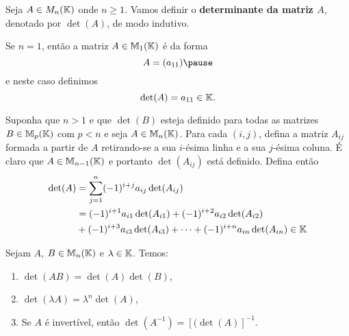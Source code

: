 \documentclass{beamer}
\begin{document}
    \begin{frame}
        Seja $A \in M_n(\mathbb{K})$ onde $n \ge 1$. \pause Vamos definir o \textbf{determinante da matriz $A$}, \pause denotado por
        $\det(A)$, \pause de modo indutivo.\pause

        Se $n = 1$, \pause então a matriz $A \in \mathbb{M}_1(\mathbb{K})$ \pause é da forma
        \[
            A = (a_{11})\pause
        \]
        e neste caso definimos\pause
        \[
            \det(A) = a_{11} \in \mathbb{K}.
        \]
    \end{frame}

\begin{frame}
        Suponha que $n > 1$ \pause e que $\det(B)$ \pause esteja definido para todas as matrizes $B \in \mathbb{M}_p(\mathbb{K})$ \pause com
        $p < n$ \pause e seja $A \in \mathbb{M}_n(\mathbb{K})$. \pause Para cada $(i,j)$, \pause defina a matriz $A_{ij}$ \pause formada a partir
        de $A$ \pause retirando-se a sua $i$-ésima linha \pause e a sua $j$-ésima coluna. \pause É claro que
        $A \in \mathbb{M}_{n - 1}(\mathbb{K})$ \pause e portanto $\det(A_{ij})$ \pause está definido. \pause Defina então\pause
        \begin{align*}
            \det(A) &= \sum_{j = 1}^n(-1)^{i + j}a_{ij}\det(A_{ij}) \\ &= (-1)^{i + 1}a_{i1}\det(A_{i1}) + (-1)^{i + 2}a_{i2}\det(A_{i2})
                 \\ & + (-1)^{i + 3}a_{i3}\det(A_{i3}) + \cdots + (-1)^{i + n}a_{in}\det(A_{in}) \in \mathbb{K}
        \end{align*}
    \end{frame}

    \begin{frame}
        \begin{proposicao}
            Sejam $A$, $B \in \mathbb{M}_n(\mathbb{K})$ \pause e $\lambda \in \mathbb{K}$. \pause Temos:\pause
            \begin{enumerate}[label={\roman*})]
                \item $\det(AB) = \det(A) \det(B)$,\pause

                \vspace*{1cm}

                \item $\det(\lambda A) = \lambda^n \det(A)$,\pause

                \vspace*{1cm}

                \item Se $A$ é invertível, \pause então $\det(A^{-1}) = [(\det(A)]^{-1}$.
            \end{enumerate}
        \end{proposicao}
    \end{frame}
\end{document}
